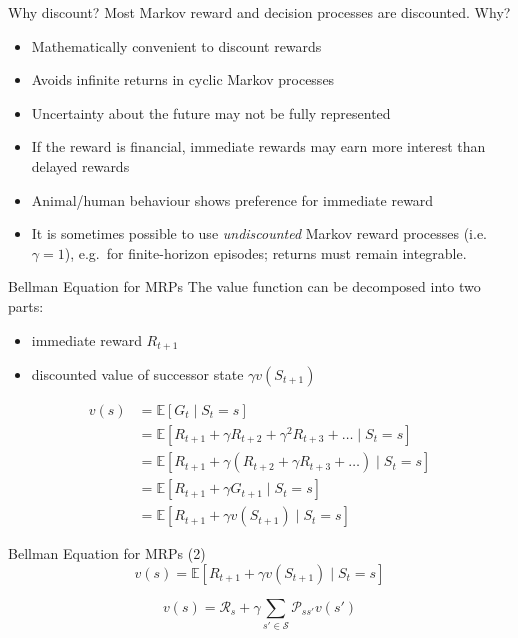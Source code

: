 \begin{frame}{Why discount?}
Most Markov reward and decision processes are discounted. Why?
\begin{itemize}
  \item Mathematically convenient to discount rewards
  \item Avoids infinite returns in cyclic Markov processes
  \item Uncertainty about the future may not be fully represented
  \item If the reward is financial, immediate rewards may earn more interest than delayed rewards
  \item Animal/human behaviour shows preference for immediate reward
  \item It is sometimes possible to use \emph{undiscounted} Markov reward processes (i.e.\ $\gamma = 1$), e.g.\ for finite-horizon episodes; returns must remain integrable.
\end{itemize}
\end{frame}

\begin{frame}{Bellman Equation for MRPs}
The value function can be decomposed into two parts:
\begin{itemize}
  \item immediate reward $R_{t+1}$
  \item discounted value of successor state $\gamma v(S_{t+1})$
\end{itemize}
\begin{align*}
v(s) &= \mathbb{E}[G_t \mid S_t = s]\\
&= \mathbb{E}\left[R_{t+1} + \gamma R_{t+2} + \gamma^2 R_{t+3} + \ldots \mid S_t = s\right]\\
&= \mathbb{E}[R_{t+1} + \gamma(R_{t+2} + \gamma R_{t+3} + \ldots) \mid S_t = s]\\
&= \mathbb{E}[R_{t+1} + \gamma G_{t+1} \mid S_t = s]\\
&= \mathbb{E}[R_{t+1} + \gamma v(S_{t+1}) \mid S_t = s]
\end{align*}
\end{frame}

\begin{frame}{Bellman Equation for MRPs (2)}
\[ v(s) = \mathbb{E}[R_{t+1} + \gamma v(S_{t+1}) \mid S_t = s] \]
\begin{center}
\end{center}
\[ v(s) = \mathcal{R}_s + \gamma \sum_{s' \in \mathcal{S}} \mathcal{P}_{ss'} v(s') \]
\end{frame}

